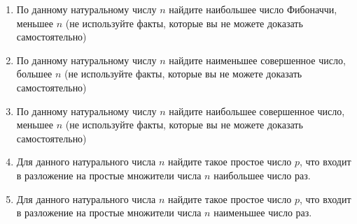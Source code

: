 \begin{enumerate}
	\item По данному натуральному числу $n$ найдите наибольшее число Фибоначчи, меньшее $n$ (не используйте факты, которые вы не можете доказать самостоятельно)

	\item По данному натуральному числу $n$ найдите наименьшее совершенное число, большее $n$ (не используйте факты, которые вы не можете доказать самостоятельно)

	\item По данному натуральному числу $n$ найдите наибольшее совершенное число, меньшее $n$ (не используйте факты, которые вы не можете доказать самостоятельно)
	\item Для данного натурального числа $n$ найдите такое простое число $p$, что входит в разложение на простые множители числа $n$ наибольшее число
		раз.
	\item Для данного натурального числа $n$ найдите такое простое число $p$, что входит в разложение на простые множители числа $n$ наименьшее число
		раз.
\end{enumerate}

